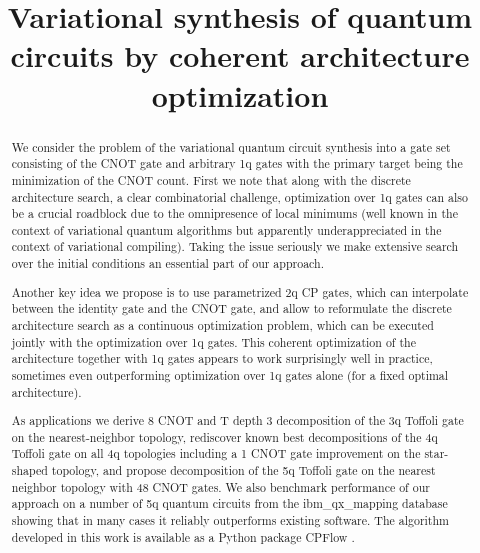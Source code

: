 \documentclass[amsfonts, amssymb, aps, nofootinbib, twocolumn]{revtex4-2}
\newcommand{\CX}{CNOT }
\newcommand{\CP}{CP }
\newcommand{\T}{T }
\newcommand{\package}[1]{\textrm {#1 }}
\newcommand{\cpflow}{\package{CPFlow}}
\begin{document}
\title{Variational synthesis of quantum circuits by coherent architecture optimization}
\begin{abstract}
We consider the problem of the variational quantum circuit synthesis into a gate set consisting of the \CX gate and arbitrary 1q gates with the primary target being the minimization of the \CX count. First we note that along with the discrete architecture search, a clear combinatorial challenge, optimization over 1q gates can also be a crucial roadblock due to the omnipresence of local minimums (well known in the context of variational quantum algorithms but apparently underappreciated in the context of variational compiling). Taking the issue seriously we make extensive search over the initial conditions an essential part of our approach. 

Another key idea we propose is to use parametrized 2q \CP gates, which can interpolate between the identity gate and the \CX gate, and allow to reformulate the discrete architecture search as a continuous optimization problem, which can be executed jointly with the optimization over 1q gates. This coherent optimization of the architecture together with 1q gates appears to work surprisingly well in practice, sometimes even outperforming optimization over 1q gates alone (for a fixed optimal architecture).

As applications we derive 8 \CX and \T depth 3 decomposition of the 3q Toffoli gate on the nearest-neighbor topology, rediscover known best decompositions of the 4q Toffoli gate on all 4q topologies including a  1 \CX gate improvement on the star-shaped topology, and propose decomposition of the 5q Toffoli gate on the nearest neighbor topology with 48 \CX gates. We also benchmark performance of our approach on a number of 5q quantum circuits from the ibm\_qx\_mapping database showing that in many cases it reliably outperforms existing software. The algorithm developed in this work is available as a Python package \cpflow \cite{}. 
\end{abstract}
\maketitle	
\tableofcontents
\end{document}
